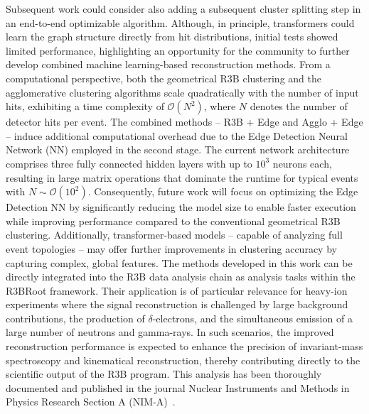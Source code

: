 Subsequent work could consider also adding a subsequent cluster splitting step in an end-to-end optimizable algorithm. Although, in principle, transformers could learn the graph structure directly from hit distributions, initial tests showed limited performance, highlighting an opportunity for the community to further develop combined machine learning-based reconstruction methods.\newline
From a computational perspective, both the geometrical R3B clustering and the agglomerative clustering algorithms scale quadratically with the number of input hits, exhibiting a time complexity of \(\mathcal{O}(N^2)\), where \(N\) denotes the number of detector hits per event. The combined methods -- R3B + Edge and Agglo + Edge -- induce additional computational overhead due to the Edge Detection Neural Network (NN) employed in the second stage. The current network architecture comprises three fully connected hidden layers with up to \(10^3\) neurons each, resulting in large matrix operations that dominate the runtime for typical events with \(N \sim \mathcal{O}(10^2)\). Consequently, future work will focus on optimizing the Edge Detection NN by significantly reducing the model size to enable faster execution while improving performance compared to the conventional geometrical R3B clustering.\newline
Additionally, transformer-based models \cite{vaswani2017attention} -- capable of analyzing full event topologies -- may offer further improvements in clustering accuracy by capturing complex, global features.\newline
The methods developed in this work can be directly integrated into the R3B data analysis chain as analysis tasks within the R3BRoot framework. Their application is of particular relevance for heavy-ion experiments where the signal reconstruction is challenged by large background contributions, the production of $\delta$-electrons, and the simultaneous emission of a large number of neutrons and gamma-rays. In such scenarios, the improved reconstruction performance is expected to enhance the precision of invariant-mass spectroscopy and kinematical reconstruction, thereby contributing directly to the scientific output of the R3B program.\newline
This analysis has been thoroughly documented and published in the journal Nuclear Instruments and Methods in Physics Research Section A (NIM-A)~\cite{JENEGGER2026171048}.
\clearpage
